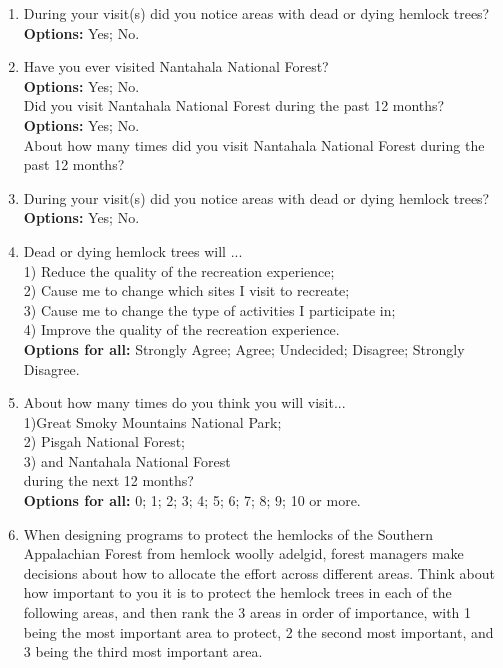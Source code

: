 \documentclass[12pt]{article}
\begin{document}
\begin{enumerate}[label=Q\arabic*., leftmargin=*]
    About how many times did you visit Pisgah National Forest during the past 12 months?
    \item During your visit(s) did you notice areas with dead or dying hemlock trees? \\
    \textbf{Options:} Yes; No. 
    \item Have you ever visited Nantahala National Forest? \\
    \textbf{Options:} Yes; No. \\
    Did you visit Nantahala National Forest during the past 12 months? \\
    \textbf{Options:} Yes; No. \\
    About how many times did you visit Nantahala National Forest during the past 12 months?
    \item During your visit(s) did you notice areas with dead or dying hemlock trees? \\
    \textbf{Options:} Yes; No. 
    \item Dead or dying hemlock trees will ... \\
    1) Reduce the quality of the recreation experience; \\
    2) Cause me to change which sites I visit to recreate; \\
    3) Cause me to change the type of activities I participate in; \\
    4) Improve the quality of the recreation experience. \\
    \textbf{Options for all:} Strongly Agree; Agree; Undecided; Disagree; Strongly Disagree.
    \item About how many times do you think you will visit...\\
    1)Great Smoky Mountains National Park;\\
    2) Pisgah National Forest;  \\
    3) and Nantahala National Forest \\
    during the next 12 months? \\
    \textbf{Options for all:} 0; 1; 2; 3; 4; 5; 6; 7; 8; 9; 10 or more.
    \item When designing programs to protect the hemlocks of the Southern Appalachian Forest from hemlock woolly adelgid, forest managers make decisions about how to allocate the effort across different areas. Think about how important to you it is to protect the hemlock trees in each of the following areas, and then rank the 3 areas in order of importance, with 1 being the most important area to protect, 2 the second most important, and 3 being the third most important area. \\

\end{enumerate}
\end{document}
